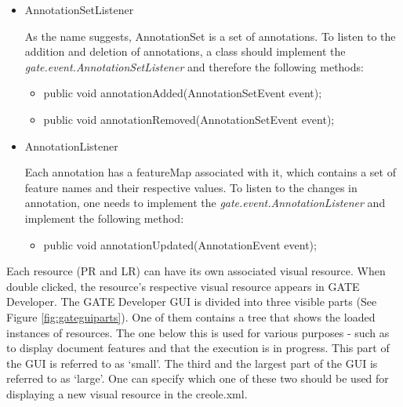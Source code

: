 \begin{itemize}
\item{AnnotationSetListener}

	As the name suggests, AnnotationSet is a set of
	annotations. To listen to the addition and deletion of annotations, a
	class should implement the \textit{gate.event.AnnotationSetListener} and
	therefore the following methods:

	\begin{itemize}
	\item{public void annotationAdded(AnnotationSetEvent event);}
	\item{public void annotationRemoved(AnnotationSetEvent event);}
	\end{itemize}

\item{AnnotationListener}

	Each annotation has a featureMap associated with it, which contains a
	set of feature names and their respective values. To listen to the
	changes in annotation, one needs to implement the
	\textit{gate.event.AnnotationListener} and implement the following
	method:

	\begin{itemize}
	\item{public void annotationUpdated(AnnotationEvent event);}
	\end{itemize}

\end{itemize}



Each resource (PR and LR) can have its own associated visual
resource. When double clicked, the resource's respective visual
resource appears in GATE Developer.  The GATE Developer GUI is divided
into three visible parts (See Figure
\ref{fig:gateguiparts}). One of them contains a tree that shows the loaded
instances of resources. The one below this is used for various purposes - such
as to display document features and that the execution is in progress. This part
of the GUI is referred to as `small'. The third and the largest part of the GUI is
referred to as `large'. One can specify which one of these two should be used for
displaying a new visual resource in the creole.xml.

